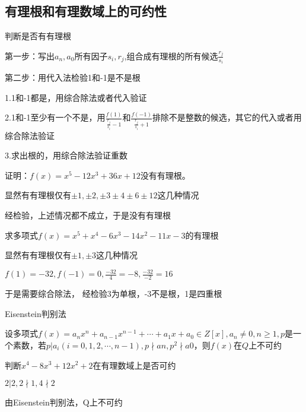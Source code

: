 \documentclass[lang=cn,10pt]{elegantbook}
\begin{document}
\subsection{有理根和有理数域上的可约性}
\begin{conclusion}判断是否有有理根
	
	第一步：写出$a_{n},a_{0}$所有因子$s_{i},r_{j}$,组合成有理根的所有候选$\frac{r_{j}}{s_{i}}$
	
	第二步：用代入法检验1和-1是不是根
	
	1.1和-1都是，用综合除法或者代入验证
	
	2.1和-1至少有一个不是，用$\frac{f(1)}{\frac{r_{j}}{s_{i}}-1}$和$\frac{f(-1)}{\frac{r_{j}}{s_{i}}+1}$排除不是整数的候选，其它的代入或者用综合除法验证
	
	3.求出根的，用综合除法验证重数
\end{conclusion}
\begin{example}
	证明：$f(x)=x^5-12x^3+36x+12$没有有理根。
\end{example}
\begin{solution}
	
	显然有有理根仅有$\pm1,\pm2,\pm3 \pm4 \pm 6 \pm12$这几种情况
	
	经检验，上述情况都不成立，于是没有有理根
\end{solution}
\begin{example}
	求多项式$f(x)=x^5+x^{4}-6x^3-14x^{2}-11x-3$的有理根
\end{example}
\begin{solution}
	
	显然有有理根仅有$\pm1,\pm3 $这几种情况
	
	$f(1)=-32,f(-1)=0,\frac{-32}{4}=-8,\frac{-32}{-2}=16$
	
	于是需要综合除法，
	经检验3为单根，-3不是根，1是四重根
\end{solution}
\begin{conclusion}Eisenstein判别法
	
	设多项式$f(x)=a_nx^n+a_{n-1}x^{n-1}+\cdots+a_1x+a_0\in Z[x],a_{n}\ne0,n\ge1,p$是一个素数，若$p|a_i(i=0,1,2,\cdots,n-1),$$p\nmid an,p^{2}\nmid a0$，则$f(x)$在$Q$上不可约
\end{conclusion}
\begin{example}
	判断$x^{4}-8x^{3}+12x^{2}+2$在有理数域上是否可约
\end{example}
\begin{solution}
	
	$2|2,2\nmid1,4\nmid2$
	
	由Eisenstein判别法，Q上不可约
\end{solution}
\end{document}
